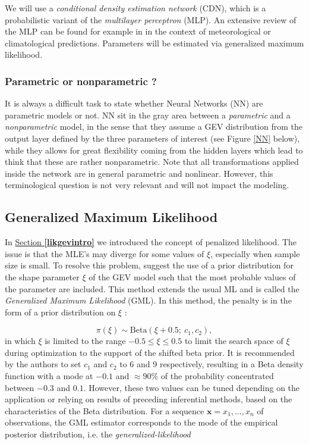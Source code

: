 We will use a \emph{conditional density estimation network} (CDN), which is a probabilistic variant of the \emph{multilayer perceptron} (MLP). 
An extensive review of the MLP can be found for example in \citet{Hsieh_Tang_1998} in the context of meteorological or climatological predictions. Parameters will be estimated via generalized maximum likelihood. 



\subsubsection*{Parametric or nonparametric ?}
It is always a difficult task to state whether Neural Networks (NN) are parametric models or not. NN sit in the gray area between a \emph{parametric} and a \emph{nonparametric} model, in the sense that they assume a GEV distribution from the output layer defined by the three parameters of interest (see Figure \ref{NN} below), while they allows for great flexibility coming from the hidden layers which lead to think that these are rather nonparametric. 
Note that all transformations applied inside the network are in general parametric and nonlinear.
However, this terminological question is not very relevant and will not impact the modeling.

\subsection{Generalized Maximum Likelihood}


In \hyperref[likgevintro]{Section \textbf{\ref{likgevintro}}} we introduced the concept of penalized likelihood. The issue is that the MLE's may diverge for some values of $\xi$, especially when sample size is small. To resolve this problem, \citet{martins_generalized_2000} suggest the use of a prior distribution for the shape parameter $\xi$ of the GEV model such
that the most probable values of the parameter are included. This method extends the usual ML and is called the \emph{Generalized Maximum Likelihood} (GML). In this method, the penalty is in the form of a prior distribution on $\xi$ : 

\begin{equation}\label{eq:betaprior}
\pi(\xi)\sim\text{Beta}(\xi+0.5 ; \ c_1,c_2),
\end{equation}
in which $\xi$ is limited to the range $-0.5\leq\xi\leq 0.5$ to limit the search space of $\xi$ during optimization to the support of the shifted beta prior. It is recommended by the authors to set $c_1$ and $c_2$ to 6 and 9 respectively, resulting in a Beta density function with a mode at $-0.1$ and $\approx 90\%$ of the probability concentrated between $-0.3$ and $0.1$. However, these two values can be tuned depending on the application or relying on results of preceding inferential methods, based on the characteristics of the Beta distribution. For a sequence $\boldsymbol{x}=x_1,\ldots,x_n$ of observations, the GML estimator corresponds to the mode of the empirical posterior distribution, i.e. the \emph{generalized-likelihood}

